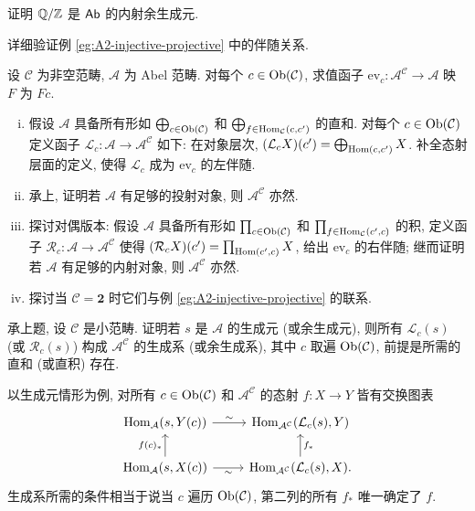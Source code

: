 \begin{Exercises}
	\item 证明 $\mathbb{Q}/\mathbb{Z}$ 是 $\mathsf{Ab}$ 的内射余生成元.
	
	\item 详细验证例 \ref{eg:A2-injective-projective} 中的伴随关系.
	
	\item 设 $\mathcal{C}$ 为非空范畴, $\mathcal{A}$ 为 Abel 范畴. 对每个 $c \in \operatorname{Ob}(\mathcal{C})$, 求值函子 $\mathrm{ev}_c: \mathcal{A}^{\mathcal{C}} \to \mathcal{A}$ 映 $F$ 为 $Fc$.
	\begin{enumerate}[(i)]
		\item 假设 $\mathcal{A}$ 具备所有形如 $\bigoplus_{c \in \operatorname{Ob}(\mathcal{C})}$ 和 $\bigoplus_{f \in \operatorname{Hom}_{\mathcal{C}}(c, c')}$ 的直和. 对每个 $c \in \operatorname{Ob}(\mathcal{C})$ 定义函子 $\mathcal{L}_c: \mathcal{A} \to \mathcal{A}^{\mathcal{C}}$ 如下: 在对象层次, $(\mathcal{L}_c X)(c') = \bigoplus_{\operatorname{Hom}(c, c')} X$. 补全态射层面的定义, 使得 $\mathcal{L}_c$ 成为 $\mathrm{ev}_c$ 的左伴随.
		\item 承上, 证明若 $\mathcal{A}$ 有足够的投射对象, 则 $\mathcal{A}^{\mathcal{C}}$ 亦然.
		\item 探讨对偶版本: 假设 $\mathcal{A}$ 具备所有形如 $\prod_{c \in \operatorname{Ob}(\mathcal{C})}$ 和 $\prod_{f \in \operatorname{Hom}_{\mathcal{C}}(c', c)}$ 的积, 定义函子 $\mathcal{R}_c: \mathcal{A} \to \mathcal{A}^{\mathcal{C}}$ 使得 $(\mathcal{R}_c X)(c') = \prod_{\operatorname{Hom}(c',c)} X$, 给出 $\mathrm{ev}_c$ 的右伴随; 继而证明若 $\mathcal{A}$ 有足够的内射对象, 则 $\mathcal{A}^{\mathcal{C}}$ 亦然.
		\item 探讨当 $\mathcal{C} = \mathbf{2}$ 时它们与例 \ref{eg:A2-injective-projective} 的联系.
	\end{enumerate}

	\item 承上题, 设 $\mathcal{C}$ 是小范畴. 证明若 $s$ 是 $\mathcal{A}$ 的生成元 (或余生成元), 则所有 $\mathcal{L}_c(s)$ (或 $\mathcal{R}_c(s)$) 构成 $\mathcal{A}^{\mathcal{C}}$ 的生成系 (或余生成系), 其中 $c$ 取遍 $\operatorname{Ob}(\mathcal{C})$, 前提是所需的直和 (或直积) 存在.

	\begin{hint}
		以生成元情形为例, 对所有 $c \in \operatorname{Ob}(\mathcal{C})$ 和 $\mathcal{A}^{\mathcal{C}}$ 的态射 $f: X \to Y$ 皆有交换图表
		\[\begin{tikzcd}
			\Hom_{\mathcal{A}}(s, Y(c)) \arrow[r, "\sim"] & \Hom_{\mathcal{A}^{\mathcal{C}}}(\mathcal{L}_c(s), Y) \\
			\Hom_{\mathcal{A}}(s, X(c)) \arrow[r, "\sim"'] \arrow[u, "{f(c)_*}"] & \Hom_{\mathcal{A}^{\mathcal{C}}}(\mathcal{L}_c(s), X) \arrow[u, "{f_*}"'] .
		\end{tikzcd}\]
		生成系所需的条件相当于说当 $c$ 遍历 $\operatorname{Ob}(\mathcal{C})$, 第二列的所有 $f_*$ 唯一确定了 $f$.
	\end{hint}


\end{Exercises}
